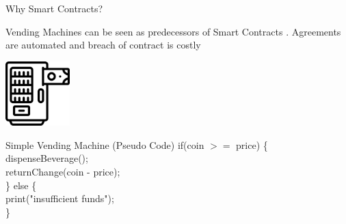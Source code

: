 \documentclass[handout]{beamer}
\begin{document}
\begin{frame}{Why Smart Contracts?}

Vending Machines can be seen as predecessors of Smart Contracts \cite{NS:94,NS:97}. Agreements are automated and breach of contract is costly

\vspace{0.5em}

\begin{minipage}{0.4\textwidth}
	\vspace{0.5em}
	\centering
	\includegraphics[width=2.5cm]{../assets/images/vendingmachine.png}
\end{minipage}
\begin{minipage}{0.55\textwidth}
	\begin{samplecode}{Simple Vending Machine (Pseudo Code)}
		if(coin $>=$ price) \{ \\
			\tab dispenseBeverage(); \\
			\tab returnChange(coin - price);\\
		\} else \{ \\
			\tab print("insufficient funds"); \\
		\}
	\end{samplecode}	
\end{minipage}



\end{frame}
\end{document}
